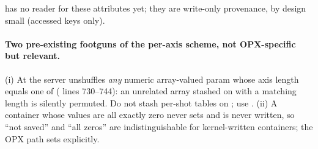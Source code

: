  has no reader for these attributes yet; they are write-only
provenance, by design small (accessed keys only).

\paragraph{Two pre-existing footguns of the per-axis scheme, not OPX-specific
but relevant.} (i) At  the server unshuffles \emph{any}
numeric array-valued param whose axis length equals one of 
( lines 730--744): an unrelated array stashed on
 with a matching length is silently permuted. Do not stash
per-shot tables on ; use . (ii) A container
whose values are all exactly zero never sets  and is
never written, so ``not saved'' and ``all zeros'' are indistinguishable for
kernel-written containers; the OPX path sets 
explicitly.
